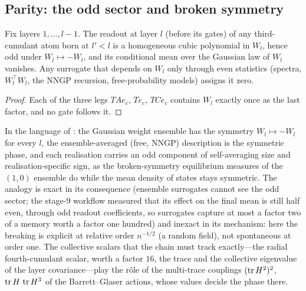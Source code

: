 \subsection{Parity: the odd sector and broken symmetry}
\begin{proposition}\label{prop:odd}
Fix layers $1,\dots,l-1$. The readout at layer $l$ (before its gates) of any third-cumulant atom born at $l'<l$ is a
homogeneous cubic polynomial in $W_l$, hence odd under $W_l\mapsto-W_l$, and its conditional mean over the Gaussian law
of $W_l$ vanishes. Any surrogate that depends on $W_l$ only through even statistics (spectra, $W_l^{\top}W_l$, the NNGP
recursion, free-probability models) assigns it zero.
\end{proposition}
\begin{proof}
Each of the three legs $TAe_c$, $Te_c$, $TCe_c$ contains $W_l$ exactly once as the last factor, and no gate follows it.
\end{proof}

In the language of \cite{DG}: the Gaussian weight ensemble has the symmetry $W_l\mapsto-W_l$ for every $l$, the
ensemble-averaged (free, NNGP) description is the symmetric phase, and each realisation carries an odd component of
self-averaging size and realisation-specific sign, as the broken-symmetry equilibrium measures of the $(1,0)$
ensemble do while the mean density of states stays symmetric. The analogy is exact in its consequence (ensemble
surrogates cannot see the odd sector; the stage-9 workflow measured that its effect on the final mean is still half
even, through odd readout coefficients, so surrogates capture at most a factor two of a memory worth a factor one
hundred) and inexact in its mechanism: here the breaking is explicit at relative order $n^{-1/2}$ (a random field),
not spontaneous at order one. The collective scalars that the chain must track exactly---the radial fourth-cumulant
scalar, worth a factor $16$, the trace and the collective eigenvalue of the layer covariance---play the r\^ole of the
multi-trace couplings $(\operatorname{tr} H^2)^2$, $\operatorname{tr} H\,\operatorname{tr} H^3$ of the Barrett--Glaser actions, whose values decide the phase there.
